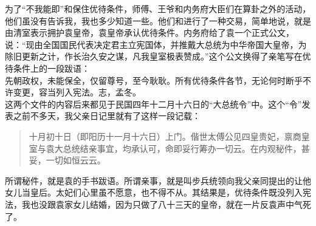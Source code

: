 为了“不我能即”和保住优待条件，师傅、王爷和内务府大臣们在算卦之外的活动，他们虽没有告诉我，我也多少知道一些。他们和进行了一种交易，简单地说，就是由清室表示拥护袁皇帝，袁皇帝承认优待条件。内务府给了袁一个正式公文，说：“现由全国国民代表决定君主立宪国体，并推戴大总统为中华帝国大皇帝，为除旧更新之计，作长治久安之谋，凡我皇室极表赞成。”这个公文换得了亲笔写在优待条件上的一段跋语：\\

先朝政权，未能保全，仅留尊号，至今耿耿。所有优待条件各节，无论何时断乎不许变更，容当列入宪法。志，孟冬。\\

这两个文件的内容后来都见于民国四年十二月十六日的“大总统令”中。这个“令”发表之前不多天，我父亲日记里就有了这样一段记载：\\

\begin{quote}
	十月初十日（即阳历十一月十六日）上门。偕世太傅公见四皇贵妃，禀商皇室与袁大总统结亲事宜，均承认可，命即妥行筹办一切云。在内观秘件，甚妥，一切如恒云云。\\
\end{quote}

所谓秘件，就是袁的手书跋语。所谓亲事，就是叫步兵统领向我父亲同提出的让他女儿当皇后。太妃们心里虽不愿意，也不得不从。其结果是，优待条件既没列入宪法，我也没跟袁家女儿结婚，因为只做了八十三天的皇帝，就在一片反袁声中气死了。
